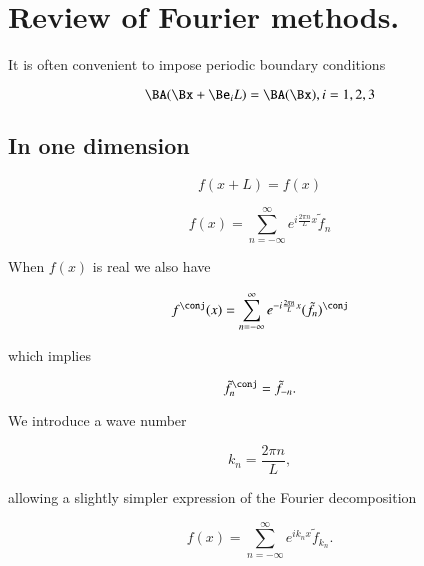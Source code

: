 \section{Review of Fourier methods.}

It is often convenient to impose periodic boundary conditions

\begin{equation}\label{eqn:relativisticElectrodynamicsL15:170}
\BA(\Bx + \Be_i L) = \BA(\Bx), i = 1,2,3
\end{equation}

\subsection{In one dimension}

\begin{equation}\label{eqn:relativisticElectrodynamicsL15:190}
f(x + L) = f(x)
\end{equation}

\begin{equation}\label{eqn:relativisticElectrodynamicsL15:210}
f(x) = \sum_{n=-\infty}^\infty e^{i \frac{2 \pi n}{L} x} \tilde{f}_n
\end{equation}

When $f(x)$ is real we also have

\begin{equation}\label{eqn:relativisticElectrodynamicsL15:230}
f^\conj(x) = \sum_{n = -\infty}^\infty e^{-i \frac{2 \pi n}{L} x} (\tilde{f}_n)^\conj
\end{equation}

which implies

\begin{equation}\label{eqn:relativisticElectrodynamicsL15:250}
{\tilde{f}^\conj}_{n} = \tilde{f}_{-n}.
\end{equation}

We introduce a wave number

\begin{equation}\label{eqn:relativisticElectrodynamicsL15:270}
k_n = \frac{2 \pi n}{L},
\end{equation}

allowing a slightly simpler expression of the Fourier decomposition

\begin{equation}\label{eqn:relativisticElectrodynamicsL15:290}
f(x) = \sum_{n=-\infty}^\infty e^{i k_n x} \tilde{f}_{k_n}.
\end{equation}

